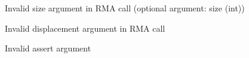 \begin{description}
\item[]Invalid size argument in RMA call (optional
  argument: size (int))
\item[]Invalid displacement argument in RMA call
\item[]Invalid assert argument
\end{description}




